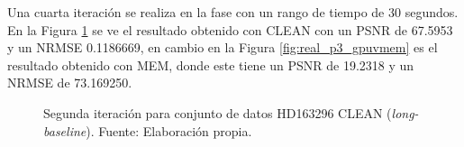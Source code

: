 Una cuarta iteración se realiza en la fase con un rango de tiempo de 30 segundos. En la Figura \ref{fig:real_p3_clean} se ve el resultado obtenido con CLEAN con un PSNR de 67.5953 y un NRMSE 0.1186669, en cambio en la Figura \ref{fig:real_p3_gpuvmem} es el resultado obtenido con MEM, donde este tiene un PSNR de 19.2318 y un NRMSE de 73.169250.

\begin{figure}[!ht]
 \centering
    \vspace{0.3cm}
 \caption[Cuarta iteración para conjunto de datos HD163296 CLEAN (\textit{long-baseline})]{Segunda iteración para conjunto de datos HD163296 CLEAN (\textit{long-baseline}). Fuente: Elaboración propia.}
 \label{fig:real_p3_clean}
\end{figure}

